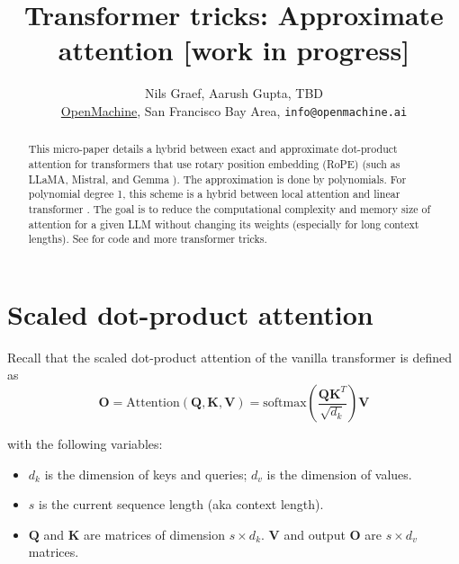\documentclass{article}
\title{Transformer tricks: Approximate attention [work in progress]}
\author{Nils Graef, Aarush Gupta, TBD \\ \href{https://openmachine.ai}{OpenMachine},
  San Francisco Bay Area, \texttt{info@openmachine.ai}}
\numberwithin{equation}{section} %
\newcommand{\mat}[1]{\mathbf{#1}}          %
\def\Q{\mat{Q}}
\def\K{\mat{K}}
\def\V{\mat{V}}
\def\O{\mat{O}}
\begin{document}
 \maketitle

\begin{abstract}
This micro-paper \citep{micro-paper} details a hybrid between exact and approximate dot-product attention for transformers that use rotary position embedding (RoPE) \citep{RoPE} (such as LLaMA, Mistral, and Gemma \citep{LLaMA, Llama2, mistral, gemma}). The approximation is done by polynomials. For polynomial degree 1, this scheme is a hybrid between local attention \citep{longformer} and linear transformer \citep{linear}. The goal is to reduce the computational complexity and memory size of attention for a given LLM without changing its weights (especially for long context lengths). See \citep{tricks, precompute} for code and more transformer tricks.
\end{abstract}

\section{Scaled dot-product attention}
Recall that the scaled dot-product attention of the vanilla transformer \citep{vanilla} is defined as
\begin{equation}
  \O = \text{Attention} \left( \Q, \K, \V \right) = \text{softmax} \left( \frac{\Q \K^T}{\sqrt{d_k}} \right) \V
\end{equation}

with the following variables:
\begin{itemize}[topsep=-1pt, itemsep=-1pt]
  \item $d_k$ is the dimension of keys and queries; $d_v$ is the dimension of values.
  \item $s$ is the current sequence length (aka context length).
  \item $\Q$ and $\K$ are matrices of dimension $s \times d_k$. $\V$ and output $\O$ are $s \times d_v$ matrices.
\end{itemize}
\end{document}
